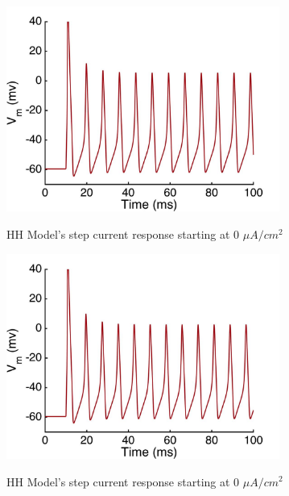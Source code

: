 \documentclass{beamer}
\begin{document}
\begin{frame}
  \begin{figure}
    \centering
    \includegraphics[width = 0.8\textwidth]{./images/current_0_65.jpg}

    HH Model's step current response starting at 0 $\mu A/cm^2$
  \end{figure}
\end{frame}


\begin{frame}
  \begin{figure}
    \centering
    \includegraphics[width = 0.8\textwidth]{./images/current_0_70.jpg}

    HH Model's step current response starting at 0 $\mu A/cm^2$
  \end{figure}
\end{frame}
\end{document}
